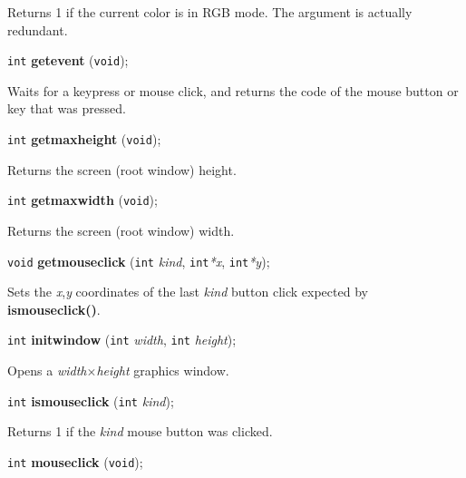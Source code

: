\documentclass[a4paper,11pt]{article}
\newcommand{\V}{\texttt{void}}      %
\newcommand{\I}{\texttt{int}}       %
\newcommand{\func}[1]{\textbf{#1}}  %
\newcommand{\A}[1]{\emph{#1}}       %
\newenvironment{bgi}
{ %
  \begin{snugshade}
}
{ %
  \end{snugshade}
}
\begin{document}
Returns 1 if the current color is in RGB mode. The argument is
actually redundant.





\begin{bgi}
\I{} \func{getevent} (\V{});
\end{bgi}

Waits for a keypress or mouse click, and returns the code of the mouse
button or key that was pressed.


\begin{bgi}
\I{} \func{getmaxheight} (\V{});
\end{bgi}

Returns the screen (root window) height.


\begin{bgi}
\I{} \func{getmaxwidth} (\V{});
\end{bgi}

Returns the screen (root window) width.


\begin{bgi}
\V{} \func{getmouseclick} (\I{} \A{kind}, \I{}\A{*x}, \I{}\A{*y});
\end{bgi}

Sets the \A{x},\A{y} coordinates of the last \A{kind} button click
expected by \func{ismouseclick()}.


\begin{bgi}
\I{} \func{initwindow} (\I{} \A{width}, \I{} \A{height});
\end{bgi}

Opens a \A{width}$\times$\A{height} graphics window.


\begin{bgi}
\I{} \func{ismouseclick} (\I{} \A{kind});
\end{bgi}

Returns 1 if the \A{kind} mouse button was clicked.


\begin{bgi}
\I{} \func{mouseclick} (\V{});
\end{bgi}
\end{document}
